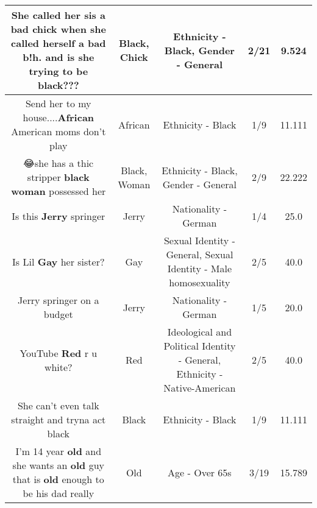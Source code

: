 \documentclass[11pt]{article}
\newlength\mylength
\begin{document}
\begin{center}
\begin{longtable}{|C{.65\mylength}|C{.30\mylength}|C{.12\mylength}|C{.12\mylength}|C{.12\mylength}|}
  \small She called her sis a bad \textbf{chick} when she called herself a bad b!h. and is she trying to be \textbf{black}???\normalsize   & Black, Chick & Ethnicity - Black, Gender - General & 2/21 & 9.524 \\  \hline
  \small Send her to my house....\textbf{African} American moms don't play\normalsize   & African & Ethnicity - Black & 1/9 & 11.111 \\  \hline
  \small 😂she has a thic stripper \textbf{black} \textbf{woman} possessed her\normalsize   & Black, Woman & Ethnicity - Black, Gender - General & 2/9 & 22.222 \\  \hline
  \small Is this \textbf{Jerry} springer\normalsize   & Jerry & Nationality - German & 1/4 & 25.0 \\  \hline
  \small Is Lil \textbf{G\textbf{ay}} her sister?\normalsize   & Gay & Sexual Identity - General, Sexual Identity - Male homosexuality & 2/5 & 40.0 \\  \hline
  \small Jerry springer on a budget\normalsize   & Jerry & Nationality - German & 1/5 & 20.0 \\  \hline
  \small YouTube \textbf{R\textbf{ed}} r u white?\normalsize   & Red &  Ideological and Political Identity - General, Ethnicity - Native-American & 2/5 & 40.0 \\  \hline
  \small She can't even talk straight and tryna act black\normalsize   & Black & Ethnicity - Black & 1/9 & 11.111 \\  \hline
  \small I'm 14 year \textbf{old} and she wants an \textbf{old} guy that is \textbf{old} enough to be his dad really\normalsize   & Old & Age - Over 65s & 3/19 & 15.789 \\  \hline

\end{longtable}
\end{center}
\end{document}
